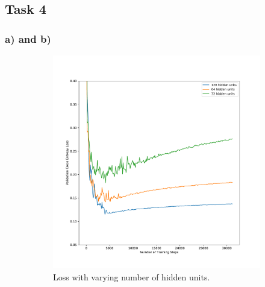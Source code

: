 \newpage
\subsection*{Task 4}

\subsubsection*{a) and b)}

\begin{figure}[h!]
  \centering
  \begin{subfigure}[b]{0.49\textwidth}
    \includegraphics[clip,trim=1cm 0cm 1cm 0cm, width=\textwidth]{figures/Task4ab_loss.pdf}
    \caption{Loss with varying number of hidden units.}
  \end{subfigure}
 \hfill 
  \begin{subfigure}[b]{0.49\textwidth}

\end{subfigure}
\end{figure}
